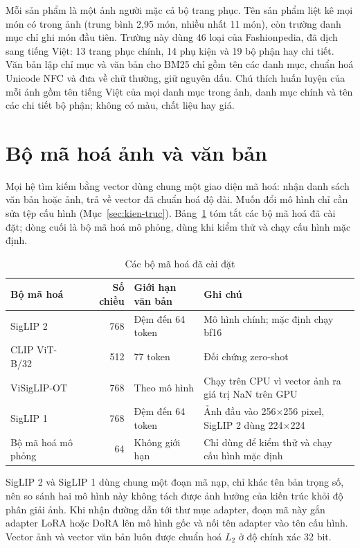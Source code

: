 Mỗi sản phẩm là một ảnh người mặc cả bộ trang phục. Tên sản phẩm liệt kê mọi món có trong ảnh (trung bình 2,95 món, nhiều nhất 11 món), còn trường danh mục chỉ ghi món đầu tiên. Trường này dùng 46 loại của Fashionpedia, đã dịch sang tiếng Việt: 13 trang phục chính, 14 phụ kiện và 19 bộ phận hay chi tiết. Văn bản lập chỉ mục và văn bản cho BM25 chỉ gồm tên các danh mục, chuẩn hoá Unicode NFC và đưa về chữ thường, giữ nguyên dấu. Chú thích huấn luyện của mỗi ảnh gồm tên tiếng Việt của mọi danh mục trong ảnh, danh mục chính và tên các chi tiết bộ phận; không có màu, chất liệu hay giá.

\section{Bộ mã hoá ảnh và văn bản}
\label{sec:ma-hoa}

Mọi hệ tìm kiếm bằng vector dùng chung một giao diện mã hoá: nhận danh sách văn bản hoặc ảnh, trả về vector đã chuẩn hoá độ dài. Muốn đổi mô hình chỉ cần sửa tệp cấu hình (Mục~\ref{sec:kien-truc}). Bảng~\ref{tab:c4_mahoa} tóm tắt các bộ mã hoá đã cài đặt; dòng cuối là bộ mã hoá mô phỏng, dùng khi kiểm thử và chạy cấu hình mặc định.

\begin{table}[H]
\centering
\caption{Các bộ mã hoá đã cài đặt}
\label{tab:c4_mahoa}
\small
\renewcommand{\arraystretch}{1.1}
\begin{tabularx}{\textwidth}{@{}p{3.6cm} r p{3.0cm} X@{}}
\toprule
\textbf{Bộ mã hoá} & \textbf{Số chiều} & \textbf{Giới hạn văn bản} & \textbf{Ghi chú} \\
\midrule
SigLIP 2~\cite{tschannen2025siglip2} & 768 & Đệm đến 64 token & Mô hình chính; mặc định chạy bf16 \\
CLIP ViT-B/32~\cite{radford2021clip} & 512 & 77 token & Đối chứng zero-shot \\
ViSigLIP-OT~\cite{viclipot2026} & 768 & Theo mô hình & Chạy trên CPU vì vector ảnh ra giá trị NaN trên GPU \\
SigLIP 1~\cite{zhai2023siglip} & 768 & Đệm đến 64 token & Ảnh đầu vào 256$\times$256 pixel, SigLIP 2 dùng 224$\times$224 \\
Bộ mã hoá mô phỏng & 64 & Không giới hạn & Chỉ dùng để kiểm thử và chạy cấu hình mặc định \\
\bottomrule
\end{tabularx}
\end{table}

SigLIP 2 và SigLIP 1 dùng chung một đoạn mã nạp, chỉ khác tên bản trọng số, nên so sánh hai mô hình này không tách được ảnh hưởng của kiến trúc khỏi độ phân giải ảnh. Khi nhận đường dẫn tới thư mục adapter, đoạn mã này gắn adapter LoRA hoặc DoRA lên mô hình gốc và nối tên adapter vào tên cấu hình. Vector ảnh và vector văn bản luôn được chuẩn hoá $L_2$ ở độ chính xác 32 bit.

